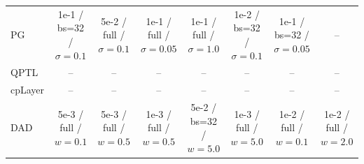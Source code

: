 \begin{table}[t]
{\begin{tabular}{@{}lccccccc@{}}
PG & 1e-1 / bs=32 / $\sigma{=}0.1$ & 5e-2 / full / $\sigma{=}0.1$ & 1e-1 / full / $\sigma{=}0.05$ & 1e-1 / full / $\sigma{=}1.0$ & 1e-2 / bs=32 / $\sigma{=}0.1$ & 1e-1 / bs=32 / $\sigma{=}0.05$ & -- \\
QPTL & -- & -- & -- & -- & -- & -- & -- \\
cpLayer & -- & -- & -- & -- & -- & -- & -- \\
DAD & 5e-3 / full / $w{=}0.1$ & 5e-3 / full / $w{=}0.5$ & 1e-3 / full / $w{=}0.5$ & 5e-2 / bs=32 / $w{=}5.0$ & 1e-3 / full / $w{=}5.0$ & 1e-2 / full / $w{=}0.1$ & 1e-2 / full / $w{=}2.0$ \\
\bottomrule
\end{tabular}}
\end{table}
